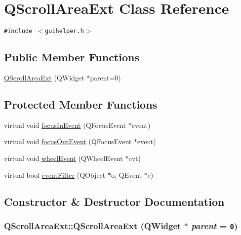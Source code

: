 \hypertarget{class_q_scroll_area_ext}{
\section{QScrollAreaExt Class Reference}
\label{class_q_scroll_area_ext}
}
{\tt \#include $<$guihelper.h$>$}

\subsection*{Public Member Functions}
\begin{CompactItemize}
\item 
\hyperlink{class_q_scroll_area_ext_f5cce171d230a7e1e1ba7f545ff305d3}{QScrollAreaExt} (QWidget $\ast$parent=0)
\end{CompactItemize}
\subsection*{Protected Member Functions}
\begin{CompactItemize}
\item 
virtual void \hyperlink{class_q_scroll_area_ext_3d883e53522c04e303add034f6db2882}{focusInEvent} (QFocusEvent $\ast$event)
\item 
virtual void \hyperlink{class_q_scroll_area_ext_69308702f79443e0c7e6c3142cca270c}{focusOutEvent} (QFocusEvent $\ast$event)
\item 
virtual void \hyperlink{class_q_scroll_area_ext_77d5c65e3b4a2c0a9fae038507cdb720}{wheelEvent} (QWheelEvent $\ast$evt)
\item 
virtual bool \hyperlink{class_q_scroll_area_ext_b2c7b82d637aa251b0f5cbe66a130b64}{eventFilter} (QObject $\ast$o, QEvent $\ast$e)
\end{CompactItemize}


\subsection{Constructor \& Destructor Documentation}
\hypertarget{class_q_scroll_area_ext_f5cce171d230a7e1e1ba7f545ff305d3}{
\subsubsection[{QScrollAreaExt}]{\setlength{\rightskip}{0pt plus 5cm}QScrollAreaExt::QScrollAreaExt (QWidget $\ast$ {\em parent} = {\tt 0})}}
\label{class_q_scroll_area_ext_f5cce171d230a7e1e1ba7f545ff305d3}




